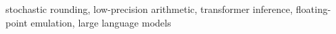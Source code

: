 \documentclass[twoside,11pt]{article}
\begin{document}
\begin{keywords}
  stochastic rounding, low-precision arithmetic, transformer inference, floating-point emulation, large language models
\end{keywords}


















\appendix




\end{document}
